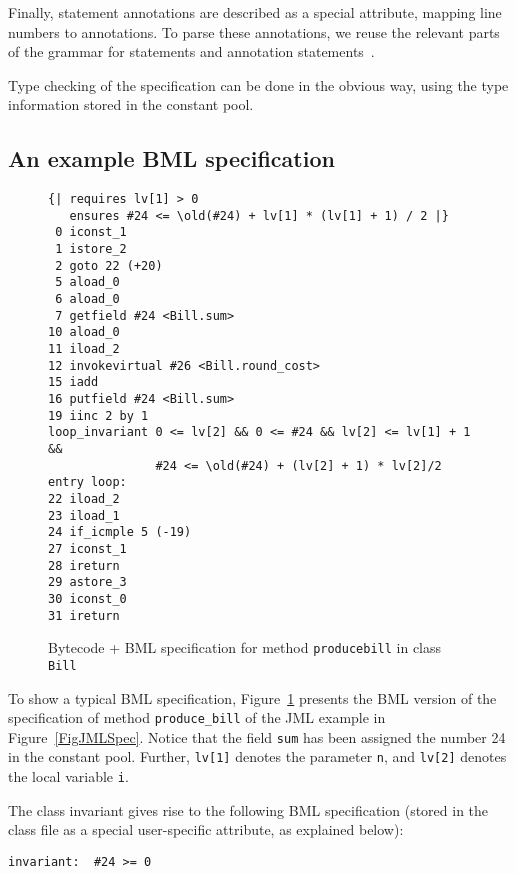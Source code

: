 Finally, statement annotations are described as a special attribute,
mapping line numbers to annotations. To parse these annotations, we
reuse the relevant parts of the grammar for statements and annotation
statements~\cite[\S A.9]{JMLReferenceManual05}.

Type checking of the specification can be done in the obvious way,
using the type information stored in the constant pool.

\subsection{An example BML specification}
\label{sec:bml:example}


\begin{figure}[t]
{\small
\begin{verbatim}
{| requires lv[1] > 0 
   ensures #24 <= \old(#24) + lv[1] * (lv[1] + 1) / 2 |}
 0 iconst_1
 1 istore_2
 2 goto 22 (+20)
 5 aload_0
 6 aload_0
 7 getfield #24 <Bill.sum>
10 aload_0
11 iload_2
12 invokevirtual #26 <Bill.round_cost>
15 iadd
16 putfield #24 <Bill.sum>
19 iinc 2 by 1
loop_invariant 0 <= lv[2] && 0 <= #24 && lv[2] <= lv[1] + 1 && 
               #24 <= \old(#24) + (lv[2] + 1) * lv[2]/2
entry loop:
22 iload_2
23 iload_1
24 if_icmple 5 (-19)
27 iconst_1
28 ireturn
29 astore_3
30 iconst_0
31 ireturn
\end{verbatim}
}
\caption{Bytecode + BML specification for method \texttt{produce\unsc bill} in class \texttt{Bill}}\label{FigBMLSpec}
\end{figure}

To show a typical BML specification, Figure~\ref{FigBMLSpec} presents
the BML version of the specification of method \texttt{produce\_bill}
of the JML example in Figure~\ref{FigJMLSpec}. Notice that the field
\texttt{sum} has been assigned the number 24 in the constant
pool. Further, \texttt{lv[1]} denotes the parameter
\texttt{n}, and \texttt{lv[2]} denotes the local variable \texttt{i}.
 
The class invariant gives rise to the following BML specification
(stored in the class file as a special user-specific attribute, as
explained below):

\begin{verbatim}
invariant:  #24 >= 0
\end{verbatim}


